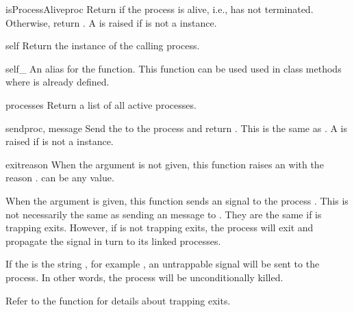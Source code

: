 \documentclass{howto}
\begin{document}
\begin{funcdesc}{isProcessAlive}{proc}
Return  if the process is alive, i.e., has not terminated.
Otherwise, return . A   is
raised if  is not a  instance.
\end{funcdesc}

\begin{funcdesc}{self}{}
Return the  instance of the calling process.
\end{funcdesc}

\begin{funcdesc}{self_}{}
An alias for the  function. This function can be used used in
class methods where  is already defined.
\end{funcdesc}

\begin{funcdesc}{processes}{}
Return a list of all active processes.
\end{funcdesc}

\begin{funcdesc}{send}{proc, message}
Send the  to the  process and return . This
is the same as \code{)}. A 
 is raised if  is not a  instance.
\end{funcdesc}

\begin{funcdesc}{exit}{reason}
When the  argument is not given, this function raises an
 with the reason .  can be any
value.

When the  argument is given, this function sends an 
signal to the process . This is not necessarily the same as sending an
 message to . They are the same if  is trapping
exits. However, if  is not trapping exits, the  process will
exit and propagate the  signal in turn to its linked processes.

If the  is the string , for example
, an untrappable  signal will be sent to
the process. In other words, the  process will be unconditionally
killed.

Refer to the  function for details about trapping exits.
\end{funcdesc}
\end{document}
